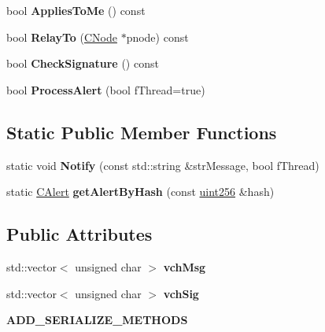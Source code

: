 \begin{DoxyCompactItemize}
\mbox{\label{class_c_alert_aba79cc9e957446fe93f05cb18f12b24b}} 
bool {\bfseries Applies\+To\+Me} () const
\item 
\mbox{\label{class_c_alert_a21a801f1a5978889722771d4eb13bf37}} 
bool {\bfseries Relay\+To} (\mbox{\hyperlink{class_c_node}{C\+Node}} $\ast$pnode) const
\item 
\mbox{\label{class_c_alert_a862d9fb7ebdfc0483b30862d2a75d527}} 
bool {\bfseries Check\+Signature} () const
\item 
\mbox{\label{class_c_alert_af3e6b2e5d3584f58c5d7be9dbd72b4cc}} 
bool {\bfseries Process\+Alert} (bool f\+Thread=true)
\end{DoxyCompactItemize}
\subsection*{Static Public Member Functions}
\begin{DoxyCompactItemize}
\item 
\mbox{\label{class_c_alert_a3da23857c8ed275621ee032a703c04a1}} 
static void {\bfseries Notify} (const std\+::string \&str\+Message, bool f\+Thread)
\item 
\mbox{\label{class_c_alert_aa37df9d177a6841ec5fa1e611c42b968}} 
static \mbox{\hyperlink{class_c_alert}{C\+Alert}} {\bfseries get\+Alert\+By\+Hash} (const \mbox{\hyperlink{classuint256}{uint256}} \&hash)
\end{DoxyCompactItemize}
\subsection*{Public Attributes}
\begin{DoxyCompactItemize}
\item 
\mbox{\label{class_c_alert_abfcb3b339d052cd3dd6670b03286758a}} 
std\+::vector$<$ unsigned char $>$ {\bfseries vch\+Msg}
\item 
\mbox{\label{class_c_alert_a541b49670ebf387a5f8b7de59277fed0}} 
std\+::vector$<$ unsigned char $>$ {\bfseries vch\+Sig}
\item 
\mbox{\label{class_c_alert_aca9310112e67fb38ef88f385a4ac6fc0}} 
{\bfseries A\+D\+D\+\_\+\+S\+E\+R\+I\+A\+L\+I\+Z\+E\+\_\+\+M\+E\+T\+H\+O\+DS}
\end{DoxyCompactItemize}


